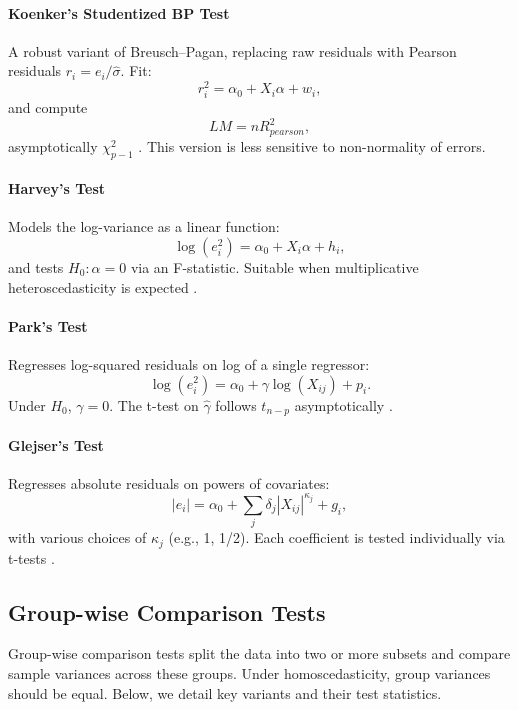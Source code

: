\paragraph{Koenker’s Studentized BP Test}\label{sec:koenker}
A robust variant of Breusch–Pagan, replacing raw residuals with Pearson residuals $r_i=e_i/\hat{\sigma}$. Fit:
\begin{equation}
  r_i^2 = \alpha_0 + X_i\alpha + w_i,
\end{equation}
and compute
\[ LM = n R^2_{pearson}, \]
asymptotically $\chi^2_{p-1}$ \citep{koenker1981study}. This version is less sensitive to non-normality of errors.

\paragraph{Harvey’s Test}\label{sec:harvey}
Models the log-variance as a linear function:
\[ \log(e_i^2) = \alpha_0 + X_i\alpha + h_i, \]
and tests $H_0: \alpha = 0$ via an F-statistic. Suitable when multiplicative heteroscedasticity is expected \citep{harvey1976estimating}.

\paragraph{Park’s Test}\label{sec:park}
Regresses log-squared residuals on log of a single regressor:
\[ \log(e_i^2) = \alpha_0 + \gamma \log(X_{ij}) + p_i. \]
Under $H_0$, $\gamma=0$. The t-test on $\hat{\gamma}$ follows $t_{n-p}$ asymptotically \citep{park1966estimation}.

\paragraph{Glejser’s Test}\label{sec:glejser}
Regresses absolute residuals on powers of covariates:
\[ |e_i| = \alpha_0 + \sum_j \delta_j |X_{ij}|^{\kappa_j} + g_i, \]
with various choices of $\kappa_j$ (e.g., 1, 1/2). Each coefficient is tested individually via t-tests \citep{glejser1969identification}.

\subsection{Group-wise Comparison Tests}\label{sec:groupwise}
Group-wise comparison tests split the data into two or more subsets and compare sample variances across these groups. Under homoscedasticity, group variances should be equal. Below, we detail key variants and their test statistics.

